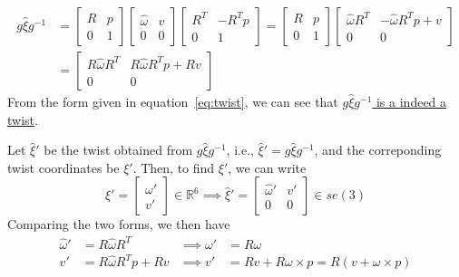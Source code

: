 \begin{align*}
    g \widehat{\xi} g^{-1}
     & =
    \begin{bmatrix}
        R & p \\
        0 & 1
    \end{bmatrix}
    \begin{bmatrix}
        \widehat{\omega} & v \\
        0                & 0
    \end{bmatrix}
    \begin{bmatrix}
        R^{T} & -R^{T} p \\
        0     & 1
    \end{bmatrix}
    =
    \begin{bmatrix}
        R & p \\
        0 & 1
    \end{bmatrix}
    \begin{bmatrix}
        \widehat{\omega} R^{T} & -\widehat{\omega} R^{T} p + v \\
        0                      & 0
    \end{bmatrix}
    \\
     & =
    \begin{bmatrix}
        R \widehat{\omega} R^{T} & R \widehat{\omega} R^{T} p + R v \\
        0                        & 0
    \end{bmatrix}
\end{align*}
From the form given in equation~\ref{eq:twist}, we can see that \underline{\( g \widehat{\xi} g^{-1} \) is a indeed a twist}.

Let \( \widehat{\xi}' \) be the twist obtained from \( g \widehat{\xi} g^{-1} \), i.e., \( \widehat{\xi}' = g \widehat{\xi} g^{-1} \), and the correponding twist coordinates be \( \xi' \).
Then, to find \( \xi' \), we can write
\begin{equation*}
    \xi'
    =
    \begin{bmatrix}
        \omega' \\
        v'
    \end{bmatrix}
    \in \mathbb{R}^{6}
    \implies
    \widehat{\xi}'
    =
    \begin{bmatrix}
        \widehat{\omega}' & v' \\
        0                 & 0
    \end{bmatrix}
    \in s e(3)
\end{equation*}
Comparing the two forms, we then have
\begin{align*}
    \widehat{\omega}'
     & =
    R \widehat{\omega} R^{T}
     &
    \implies
    \omega'
     & =
    R \omega
    \\
    v'
     & =
    R \widehat{\omega} R^{T} p + R v
     &
    \implies
    v'
     & =
    R v + R \omega \times p
    =
    R ( v + \omega \times p )
\end{align*}
